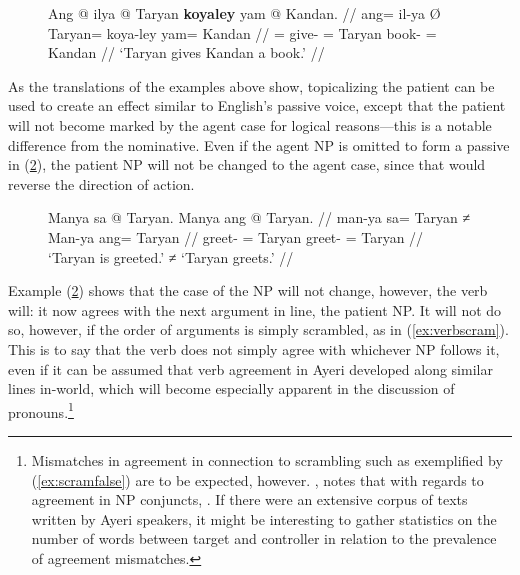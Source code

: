 \begin{figure}
\ex\label{ex:ditrpat}
\begingl
	\gla Ang @ ilya {} @ Taryan \textbf{koyaley} yam @ Kandan. //
	\glb ang= il-ya Ø Taryan= koya-ley yam= Kandan //
	\glc \AgtT{}= give-\TsgM{} \Top{}= Taryan book-\PargI{} \Dat{}= Kandan //
	\glft `Taryan gives Kandan a book.' //
\endgl
\xe
\end{figure}

As the translations of the examples above show, topicalizing the patient can be
used to create an effect similar to English's passive voice, except that the
patient will not become marked by the agent case for logical reasons---this is
a notable difference from the nominative. Even if the agent NP is omitted to
form a passive in (\ref{ex:agtnotnom}), the patient NP will not be changed to
the agent case, since that would reverse the direction of action.

\begin{figure}
\ex\label{ex:agtnotnom}\begingl
	\gla Manya sa @ Taryan. {} Manya ang @ Taryan. //
	\glb man-ya sa= Taryan ≠ Man-ya ang= Taryan //
	\glc greet-\TsgM{} \Parg{}= Taryan {} greet-\TsgM{} \Aarg{}= Taryan //
	\glft `Taryan is greeted.' ≠ `Taryan greets.' //
\endgl\xe
\end{figure}

Example (\ref{ex:agtnotnom}) shows that the case of the NP will not change, however,
the verb will: it now agrees with the next argument in line, the patient NP. It
will not do so, however, if the order of arguments is simply scrambled, as in
(\ref{ex:verbscram}). This is to say that the verb does not simply agree with
whichever NP follows it, even if it can be assumed that verb agreement in Ayeri
developed along similar lines in-world, which will become especially apparent
in the discussion of pronouns.\footnote{Mismatches in agreement in connection
to scrambling such as exemplified by (\ref{ex:scramfalse}) are to be expected,
however. \citet{corbett2006}, notes that with regards to agreement in NP
conjuncts, . If there were an extensive corpus of texts written by Ayeri
speakers, it might be interesting to gather statistics on the number of words
between target and controller in relation to the prevalence of agreement
mismatches.}

